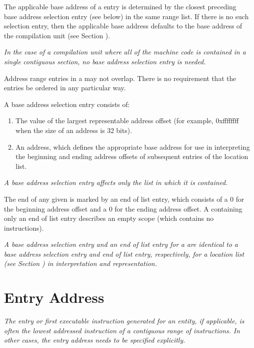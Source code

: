 The applicable base address of a  entry
is determined
by the closest preceding base address selection entry (see
below) in the same range list. If there is no such selection
entry, then the applicable base address defaults to the base
address of the compilation unit 
(see Section ).

\textit{In the case of a compilation unit where all of the machine
code is contained in a single contiguous section, no base
address selection entry is needed.}

Address range entries in
a  may not overlap.
There is no requirement that
the entries be ordered in any particular way.

A base address selection entry consists of:

\begin{enumerate}[1]
\item The value of the largest representable address offset (for example, 0xffffffff when the size of
an address is 32 bits).

\item An address, which defines the appropriate base address for use in interpreting the beginning
and ending address offsets of subsequent entries of the location list.
\end{enumerate}
\textit{A base address selection entry 
affects only the list in which it is contained.}


The end of any given  is marked by an 
end of list entry, 
which consists of a 0 for the beginning address
offset and a 0 for the ending address offset. 
A 
containing only an end of list entry describes an empty scope
(which contains no instructions).

\textit{A base address selection entry and an 
end of list entry for
a  
are identical to a base address selection entry
and end of list entry, respectively, for a location list
(see Section ) 
in interpretation and representation.}



\section{Entry Address}
\label{chap:entryaddress}
\textit{The entry or first executable instruction generated
for an entity, if applicable, is often the lowest addressed
instruction of a contiguous range of instructions. In other
cases, the entry address needs to be specified explicitly.}

